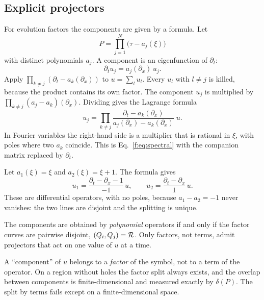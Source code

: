 \subsection{Explicit projectors}

For evolution factors the components are given by a formula. Let
\[
P=\prod_{j=1}^N\big(\tau-a_j(\xi)\big)
\]
with distinct polynomials $a_j$. A component is an eigenfunction of $\partial_t$:
\[
\partial_tu_j=a_j(\partial_x)\,u_j .
\]
Apply $\prod_{k\ne j}(\partial_t-a_k(\partial_x))$ to $u=\sum_lu_l$. Every $u_l$ with $l\ne j$ is killed, because the product contains its own factor. The component $u_j$ is multiplied by $\prod_{k\ne j}(a_j-a_k)(\partial_x)$. Dividing gives the Lagrange formula
\begin{equation}\label{f:eq:lagrange}
u_j=\prod_{k\ne j}\frac{\partial_t-a_k(\partial_x)}{a_j(\partial_x)-a_k(\partial_x)}\;u .
\end{equation}
In Fourier variables the right-hand side is a multiplier that is rational in $\xi$, with poles where two $a_k$ coincide. This is Eq.~\eqref{f:eq:spectral} with the companion matrix replaced by $\partial_t$.

\begin{example}
Let $a_1(\xi)=\xi$ and $a_2(\xi)=\xi+1$. The formula gives
\[
u_1=\frac{\partial_t-\partial_x-1}{-1}\,u,\qquad u_2=\frac{\partial_t-\partial_x}{1}\,u .
\]
These are differential operators, with no poles, because $a_1-a_2=-1$ never vanishes: the two lines are disjoint and the splitting is unique.
\end{example}

\begin{proposition}\label{prop:poly-proj}
The components are obtained by \emph{polynomial} operators if and only if the factor curves are pairwise disjoint, $(Q_i,Q_j)=\mathcal{R}$. Only factors, not terms, admit projectors that act on one value of $u$ at a time.

\end{proposition}

\begin{keypoint}
A ``component'' of $u$ belongs to a \emph{factor} of the symbol, not to a term of the operator. On a region without holes the factor split always exists, and the overlap between components is finite-dimensional and measured exactly by $\delta(P)$. The split by terms fails except on a finite-dimensional space.
\end{keypoint}

